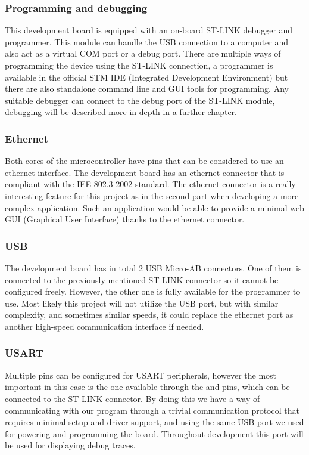 \subsubsection{Programming and debugging}

This development board is equipped with an on-board ST-LINK debugger and programmer. This module can handle the USB connection to a computer and also act as a virtual COM port or a debug port. There are multiple ways of programming the device using the ST-LINK connection, a programmer is available in the official STM IDE (Integrated Development Environment) but there are also standalone command line and GUI tools for programming. Any suitable debugger can connect to the debug port of the ST-LINK module, debugging will be described more in-depth in a further chapter.

\subsubsection{Ethernet}

Both cores of the microcontroller have pins that can be considered to use an ethernet interface. The development board has an ethernet connector that is compliant with the IEE-802.3-2002 standard. The ethernet connector is a really interesting feature for this project as in the second part when developing a more complex application. Such an application would be able to provide a minimal web GUI (Graphical User Interface) thanks to the ethernet connector.

\subsubsection{USB}

The development board has in total 2 USB Micro-AB connectors. One of them is connected to the previously mentioned ST-LINK connector so it cannot be configured freely. However, the other one is fully available for the programmer to use. Most likely this project will not utilize the USB port, but with similar complexity, and sometimes similar speeds, it could replace the ethernet port as another high-speed communication interface if needed.

\subsubsection{USART}

Multiple pins can be configured for USART peripherals, however the most important in this case is the one available through the  and  pins, which can be connected to the ST-LINK connector. By doing this we have a way of communicating with our program through a trivial communication protocol that requires minimal setup and driver support, and using the same USB port we used for powering and programming the board. Throughout development this port will be used for displaying debug traces.

